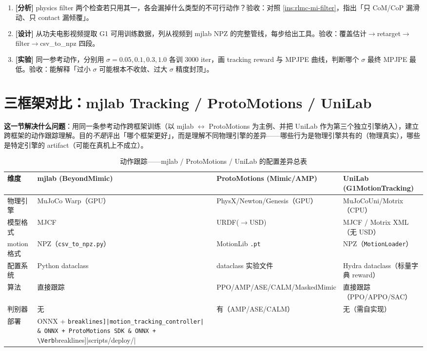 \begin{practice}[本节练习]
\begin{enumerate}
  \item \textbf{[分析]} physics filter 两个检查若只用其一，各会漏掉什么类型的不可行动作？验收：对照 \cref{ins:rlmc-mi-filter}，指出「只 CoM/CoP 漏滑动、只 contact 漏倾覆」。
  \item \textbf{[设计]} 从功夫电影视频提取 G1 可用训练数据，列从视频到 mjlab NPZ 的完整管线，每步给出工具。验收：覆盖估计$\to$retarget$\to$filter$\to$csv\_to\_npz 四段。
  \item \textbf{[实验]} 同一参考动作，分别用 $\sigma=0.05,0.1,0.3,1.0$ 各训 3000 iter，画 tracking reward 与 MPJPE 曲线，判断哪个 $\sigma$ 最终 MPJPE 最低。验收：能解释「过小 $\sigma$ 可能根本不收敛、过大 $\sigma$ 精度封顶」。
\end{enumerate}
\end{practice}

\section{三框架对比：mjlab Tracking / ProtoMotions / UniLab}
\label{sec:rlmc-mi-compare}

\textbf{这一节解决什么问题}：用同一条参考动作跨框架训练（以 mjlab $\leftrightarrow$ ProtoMotions 为主例、并把 UniLab 作为第三个独立引擎纳入），建立跨框架的动作跟踪理解。目的\emph{不是}评出「哪个框架更好」，而是理解不同物理引擎的差异——哪些行为是物理引擎共有的（物理真实），哪些是特定引擎的 artifact（可能在真机上不成立）。

\begin{table}[ht]
\centering
\small
\caption{动作跟踪——mjlab / ProtoMotions / UniLab 的配置差异总表}
\label{tab:rlmc-mi-cfgdiff}
\begin{tabular}{@{}p{1.9cm}p{3.0cm}p{4.0cm}p{3.6cm}@{}}
\toprule
维度 & mjlab (BeyondMimic) & ProtoMotions (Mimic/AMP) & UniLab (G1MotionTracking) \\
\midrule
物理引擎 & MuJoCo Warp（GPU） & PhysX/Newton/Genesis（GPU） & MuJoCoUni/Motrix（CPU） \\
模型格式 & MJCF & URDF($\to$USD) & MJCF / Motrix XML（无 USD） \\
motion 格式 & NPZ（\verb|csv_to_npz.py|） & MotionLib \verb|.pt| & NPZ（\verb|MotionLoader|） \\
配置系统 & Python dataclass & dataclass 实验文件 & Hydra dataclass（标量字典 reward） \\
算法 & 直接跟踪 & PPO/AMP/ASE/CALM/MaskedMimic & 直接跟踪（PPO/APPO/SAC） \\
判别器 & 无 & 有（AMP/ASE/CALM） & 无（需自实现） \\
部署 & ONNX + \Verb[breaklines]|motion_tracking_controller| & ONNX + ProtoMotions SDK & ONNX + \Verb[breaklines]|scripts/deploy/| \\
\bottomrule
\end{tabular}
\end{table}

